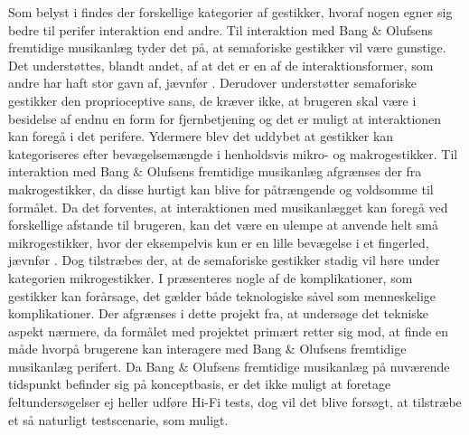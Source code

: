 Som belyst i  findes der forskellige kategorier af gestikker, hvoraf nogen egner sig bedre til perifer interaktion end andre. Til interaktion med Bang $\&$ Olufsens fremtidige musikanlæg tyder det på, at semaforiske gestikker vil være gunstige. Det understøttes, blandt andet, af at det er en af de interaktionsformer, som andre har haft stor gavn af, jævnfør . Derudover understøtter semaforiske gestikker den proprioceptive sans, de kræver ikke, at brugeren skal være i besidelse af endnu en form for fjernbetjening og det er muligt at interaktionen kan foregå i det perifere. Ydermere blev det uddybet at gestikker kan kategoriseres efter bevægelsemængde i henholdsvis mikro- og makrogestikker. Til interaktion med Bang $\&$ Olufsens fremtidige musikanlæg afgrænses der fra makrogestikker, da disse hurtigt kan blive for påtrængende og voldsomme til formålet. Da det forventes, at interaktionen med musikanlægget kan foregå ved forskellige afstande til brugeren, kan det være en ulempe at anvende helt små mikrogestikker, hvor der eksempelvis kun er en lille bevægelse i et fingerled, jævnfør . Dog tilstræbes der, at de semaforiske gestikker stadig vil høre under kategorien mikrogestikker.\blankline
%
I  præsenteres nogle af de komplikationer, som gestikker kan forårsage, det gælder både teknologiske såvel som menneskelige komplikationer. Der afgrænses i dette projekt fra, at undersøge det tekniske aspekt nærmere, da formålet med projektet primært retter sig mod, at finde en måde hvorpå brugerene kan interagere med Bang $\&$ Olufsens fremtidige musikanlæg perifert. Da Bang $\&$ Olufsens fremtidige musikanlæg på nuværende tidspunkt befinder sig på konceptbasis, er det ikke muligt at foretage feltundersøgelser ej heller udføre Hi-Fi tests, dog vil det blive forsøgt, at tilstræbe et så naturligt testscenarie, som muligt. 


